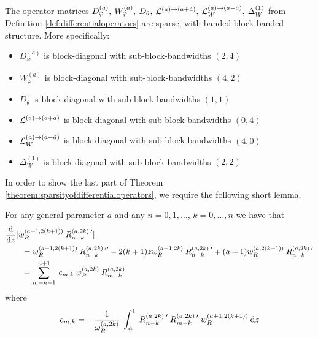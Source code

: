 \documentclass[11pt, oneside]{article}   	%
\begin{document}
\begin{theorem}\label{theorem:sparsityofdifferentialoperators}
	The operator matrices $D_\varphi^{(a)}, \: W_\varphi^{(a)}, \: D_\theta, \: \mathcal{L}^{(a)\to(a+\tilde a)}, \: \mathcal{L}_W^{(a)\to(a-\tilde a)}, \: \Delta^{(1)}_W$ from Definition \ref{def:differentialoperators} are sparse, with banded-block-banded structure. More specifically:
\begin{itemize}
	\item $D_\varphi^{(a)}$ is block-diagonal with sub-block-bandwidths $(2, 4)$
  	\item $W_\varphi^{(a)}$ is block-diagonal with sub-block-bandwidths $(4, 2)$
	\item $D_\theta$ is block-diagonal with sub-block-bandwidths $(1, 1)$
	\item $\mathcal{L}^{(a)\to(a+\tilde a)}$ is block-diagonal with sub-block-bandwidths $(0, 4)$
	\item $\mathcal{L}_W^{(a)\to(a-\tilde a)}$ is block-diagonal with sub-block-bandwidths $(4, 0)$
	\item $\Delta^{(1)}_W$ is block-diagonal with sub-block-bandwidths $(2, 2)$
\end{itemize}
\end{theorem}

In order to show the last part of Theorem \ref{theorem:sparsityofdifferentialoperators}, we require the following short lemma.

\begin{lemma}\label{lemma:Rsecondderivative}
	For any general parameter $a$ and any $n = 0,1,\dots$, $k = 0,\dots,n$ we have that
\begin{align*}
	&{{\rm d} \over {\rm d} z}[w_R^{(a+1, 2(k+1))} \: R_{n-k}^{(a,2k) \: \prime}] \\
	&\quad \quad = w_R^{(a+1, 2(k+1))} \: R_{n-k}^{(a,2k) \: \prime \prime} - 2(k+1)z w_R^{(a+1, 2k)} \: R_{n-k}^{(a,2k) \: \prime} + (a+1) w_R^{(a, 2(k+1))} \: R_{n-k}^{(a,2k) \: \prime} \\
	&\quad \quad = \sum_{m = n-1}^{n+1} \: c_{m,k} \: w_R^{(a, 2k)} \: R_{m-k}^{(a,2k)}
\end{align*}
where 
\begin{align*}
	c_{m,k} = - \frac{1}{\omega_R^{(a,2k)}} \: \int_\alpha^1 \: R_{n-k}^{(a,2k) \: \prime} \: R_{m-k}^{(a,2k) \: \prime} \: w_R^{(a+1, 2(k+1))} \: {\rm d} z
\end{align*}
\end{lemma}
\end{document}
